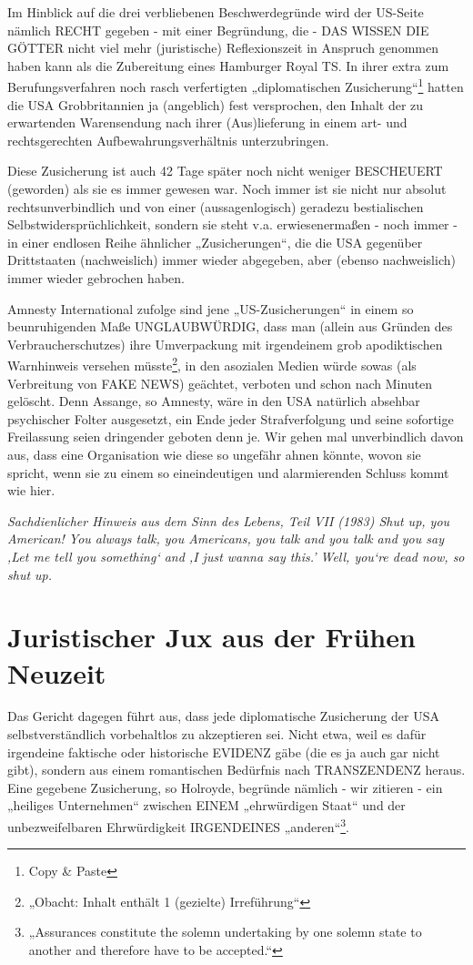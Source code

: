 \begin{multicols}{2}
Im Hinblick auf die drei verbliebenen Beschwerdegründe wird der US-Seite nämlich RECHT gegeben - mit
einer Begründung, die - DAS WISSEN DIE GÖTTER nicht viel mehr (juristische) Reflexionszeit in Anspruch
genommen haben kann als die Zubereitung eines Hamburger Royal TS. In ihrer extra zum Berufungsverfahren noch rasch verfertigten 
„diplomatischen Zusicherung“\footnote[30]{Copy \& Paste}
hatten die USA Grobbritannien ja (angeblich) fest versprochen, den Inhalt der zu erwartenden Warensendung
nach ihrer (Aus)lieferung in einem art- und rechtsgerechten Aufbewahrungsverhältnis unterzubringen.

Diese Zusicherung ist auch 42 Tage später noch nicht
weniger BESCHEUERT (geworden) als sie es immer gewesen war. Noch immer ist sie nicht nur absolut rechtsunverbindlich und von einer (aussagenlogisch) geradezu bestialischen Selbstwidersprüchlichkeit, sondern
sie steht v.a. erwiesenermaßen - noch immer - in einer
endlosen Reihe ähnlicher „Zusicherungen“, die die USA
gegenüber Drittstaaten (nachweislich) immer wieder
abgegeben, aber (ebenso nachweislich) immer wieder
gebrochen haben.

Amnesty International zufolge sind jene „US-Zusicherungen“ in einem so beunruhigenden Maße UNGLAUBWÜRDIG, dass man (allein aus Gründen des Verbraucherschutzes) ihre Umverpackung mit irgendeinem
grob apodiktischen Warnhinweis versehen müsste\footnote[31]{„Obacht: Inhalt enthält 1 (gezielte) Irreführung“}, in
den asozialen Medien würde sowas (als Verbreitung von
FAKE NEWS) geächtet, verboten und schon nach Minuten gelöscht. Denn Assange, so Amnesty, wäre in den
USA natürlich absehbar psychischer Folter ausgesetzt,
ein Ende jeder Strafverfolgung und seine sofortige Freilassung seien dringender geboten denn je. Wir gehen
mal unverbindlich davon aus, dass eine Organisation
wie diese so ungefähr ahnen könnte, wovon sie spricht,
wenn sie zu einem so eineindeutigen und alarmierenden Schluss kommt wie hier.

\textit{Sachdienlicher Hinweis aus dem Sinn des Lebens, Teil VII (1983)
Shut up, you American! You always talk, you Americans, you talk and you talk and you say 
‚Let me tell you something‘ and ‚I just wanna say this.’ Well, you‘re dead now, so shut up.}


\section{Juristischer Jux aus der Frühen Neuzeit}
Das Gericht dagegen führt aus, dass jede diplomatische
Zusicherung der USA selbstverständlich vorbehaltlos zu
akzeptieren sei. Nicht etwa, weil es dafür irgendeine faktische oder historische EVIDENZ gäbe (die es ja auch gar
nicht gibt), sondern aus einem romantischen Bedürfnis
nach TRANSZENDENZ heraus. Eine gegebene Zusicherung, so Holroyde, begründe nämlich - wir zitieren - ein
„heiliges Unternehmen“ zwischen EINEM „ehrwürdigen Staat“ und der unbezweifelbaren Ehrwürdigkeit 
IRGENDEINES „anderen“\footnote[32]{„Assurances constitute the solemn undertaking by one solemn state to another and therefore have to be accepted.“}.


\end{multicols}
